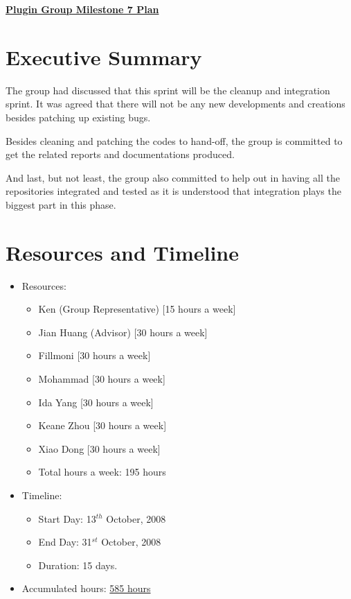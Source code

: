 \documentclass{article}
\begin{document}
\pagestyle{headings}

\begin{center}
{\large\textbf{\underline{Plugin Group Milestone 7 Plan}}}
\end{center}

\section*{Executive Summary}

The group had discussed that this sprint will be the cleanup and integration sprint. It was agreed that there will not be any new developments and creations besides patching up existing bugs. 

Besides cleaning and patching the codes to hand-off, the group is committed to get the related reports and documentations produced. 

And last, but not least, the group also committed to help out in having all the repositories integrated and tested as it is understood that integration plays the biggest part in this phase. 

\section*{Resources and Timeline}

\begin{itemize}
    \item Resources:
        \begin{itemize}
            \item Ken (Group Representative) [15 hours a week]
            \item Jian Huang (Advisor) [30 hours a week]
            \item Fillmoni [30 hours a week]
            \item Mohammad [30 hours a week]
            \item Ida Yang [30 hours a week]
            \item Keane Zhou [30 hours a week]
            \item Xiao Dong [30 hours a week]
            \item Total hours a week: 195 hours 
        \end{itemize}
    \item Timeline:
        \begin{itemize}
            \item Start Day: 13$^{th}$ October, 2008
            \item End Day: 31$^{st}$ October, 2008
            \item Duration: 15 days.
        \end{itemize}
    \item Accumulated hours: \underline{585 hours}
\end{itemize}
\end{document}
